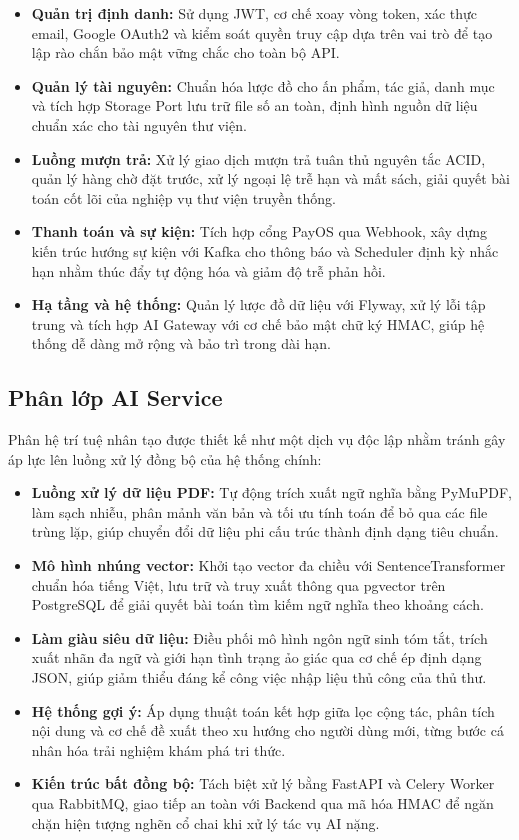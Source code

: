 \begin{itemize}
    \item \textbf{Quản trị định danh:} Sử dụng JWT, cơ chế xoay vòng token, xác thực email, Google OAuth2 và kiểm soát quyền truy cập dựa trên vai trò để tạo lập rào chắn bảo mật vững chắc cho toàn bộ API.
    \item \textbf{Quản lý tài nguyên:} Chuẩn hóa lược đồ cho ấn phẩm, tác giả, danh mục và tích hợp Storage Port lưu trữ file số an toàn, định hình nguồn dữ liệu chuẩn xác cho tài nguyên thư viện.
    \item \textbf{Luồng mượn trả:} Xử lý giao dịch mượn trả tuân thủ nguyên tắc ACID, quản lý hàng chờ đặt trước, xử lý ngoại lệ trễ hạn và mất sách, giải quyết bài toán cốt lõi của nghiệp vụ thư viện truyền thống.
    \item \textbf{Thanh toán và sự kiện:} Tích hợp cổng PayOS qua Webhook, xây dựng kiến trúc hướng sự kiện với Kafka cho thông báo và Scheduler định kỳ nhắc hạn nhằm thúc đẩy tự động hóa và giảm độ trễ phản hồi.
    \item \textbf{Hạ tầng và hệ thống:} Quản lý lược đồ dữ liệu với Flyway, xử lý lỗi tập trung và tích hợp AI Gateway với cơ chế bảo mật chữ ký HMAC, giúp hệ thống dễ dàng mở rộng và bảo trì trong dài hạn.
\end{itemize}

\subsection{Phân lớp AI Service}

Phân hệ trí tuệ nhân tạo được thiết kế như một dịch vụ độc lập nhằm tránh gây áp lực lên luồng xử lý đồng bộ của hệ thống chính:

\begin{itemize}
    \item \textbf{Luồng xử lý dữ liệu PDF:} Tự động trích xuất ngữ nghĩa bằng PyMuPDF, làm sạch nhiễu, phân mảnh văn bản và tối ưu tính toán để bỏ qua các file trùng lặp, giúp chuyển đổi dữ liệu phi cấu trúc thành định dạng tiêu chuẩn.
    \item \textbf{Mô hình nhúng vector:} Khởi tạo vector đa chiều với SentenceTransformer chuẩn hóa tiếng Việt, lưu trữ và truy xuất thông qua pgvector trên PostgreSQL để giải quyết bài toán tìm kiếm ngữ nghĩa theo khoảng cách.
    \item \textbf{Làm giàu siêu dữ liệu:} Điều phối mô hình ngôn ngữ sinh tóm tắt, trích xuất nhãn đa ngữ và giới hạn tình trạng ảo giác qua cơ chế ép định dạng JSON, giúp giảm thiểu đáng kể công việc nhập liệu thủ công của thủ thư.
    \item \textbf{Hệ thống gợi ý:} Áp dụng thuật toán kết hợp giữa lọc cộng tác, phân tích nội dung và cơ chế đề xuất theo xu hướng cho người dùng mới, từng bước cá nhân hóa trải nghiệm khám phá tri thức.
    \item \textbf{Kiến trúc bất đồng bộ:} Tách biệt xử lý bằng FastAPI và Celery Worker qua RabbitMQ, giao tiếp an toàn với Backend qua mã hóa HMAC để ngăn chặn hiện tượng nghẽn cổ chai khi xử lý tác vụ AI nặng.
\end{itemize}

